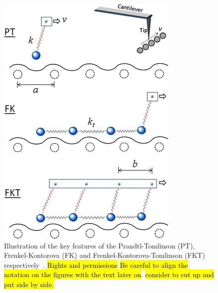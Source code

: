 \begin{figure}[H]
  \centering
  \includegraphics[width=0.4\linewidth]{figures/theory/PT_FK_FKT.png}
  \caption{Illustration of the key features of the Prandtl-Tomlinson (\acrshort{PT}), Frenkel-Kontorova (\acrshort{FK}) and Frenkel-Kontorova-Tomlinson (\acrshort{FKT}) respectively~\cite{Yalin_2011}. \hl{Rights and permissions} \hl{Be careful to align the notation on the figures with the text later on}. \hl{consider to cut up and put side by side.}}
  \label{fig:PT_FK_FKT}
\end{figure}


